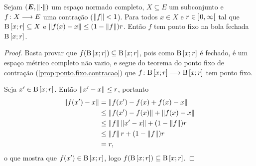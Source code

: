 \begin{proposition}
\label{prop:lema.contracao}
Sejam $(\bm E,\left\Vert{\bm{\cdot}}\right\Vert)$ um espaço normado completo, $X \subseteq E$ um subconjunto e ${f}\colon {X} \longrightarrow {E}$ uma contração ($\left\Vert{f}\right\Vert<1$). Para todos $x \in X$ e $r \in \left]{0},{\infty}\right[$ tal que $\mathrm{B}\left[{x};{r}\right] \subseteq X$ e $\left\Vert{f(x)-x}\right\Vert \leq (1-\left\Vert{f}\right\Vert)r$. Então $f$ tem ponto fixo na bola fechada $\mathrm{B}\left[{x};{r}\right]$.
\end{proposition}
\begin{proof}
Basta provar que $f(\mathrm{B}\left[{x};{r}\right]) \subseteq \mathrm{B}\left[{x};{r}\right]$, pois como $\mathrm{B}\left[{x};{r}\right]$ é fechado, é um espaço métrico completo não vazio, e segue do teorema do ponto fixo de contração (\ref{prop:ponto.fixo.contracao}) que ${f}\colon {\mathrm{B}\left[{x};{r}\right]} \longrightarrow {\mathrm{B}\left[{x};{r}\right]}$ tem ponto fixo.

Seja $x' \in \mathrm{B}\left[{x};{r}\right]$. Então $\left\Vert{x'-x}\right\Vert \leq r$, portanto
	\begin{align*}
	\left\Vert{f(x')-x}\right\Vert &= \left\Vert{f(x') - f(x) + f(x) - x}\right\Vert \\
		&\leq \left\Vert{f(x') - f(x)}\right\Vert + \left\Vert{f(x) - x}\right\Vert \\
		&\leq \left\Vert{f}\right\Vert\left\Vert{x'-x}\right\Vert + (1-\left\Vert{f}\right\Vert)r \\
		&\leq \left\Vert{f}\right\Vert r + (1-\left\Vert{f}\right\Vert)r \\
		&= r,
	\end{align*}
o que mostra que $f(x') \in \mathrm{B}\left[{x};{r}\right]$, logo $f(\mathrm{B}\left[{x};{r}\right]) \subseteq \mathrm{B}\left[{x};{r}\right]$.
\end{proof}

